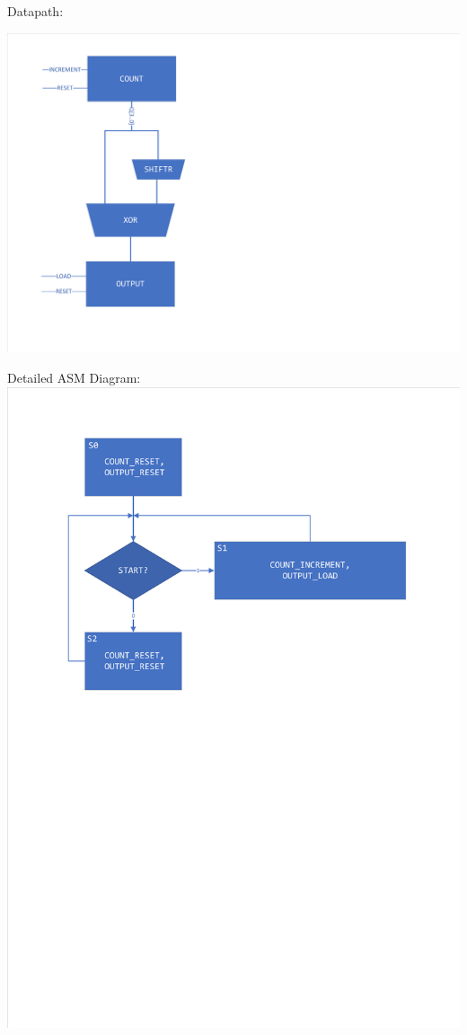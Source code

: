 \documentclass[12pt, a4paper]{article}
\begin{document}
	Datapath:\\
	\begin{center}
		\includegraphics[scale=0.8]{5bDatapath.pdf}
	\end{center}
	
	Detailed ASM Diagram:\\
	\includegraphics[scale=0.8]{5bDetailedASM.pdf}
\end{document}
